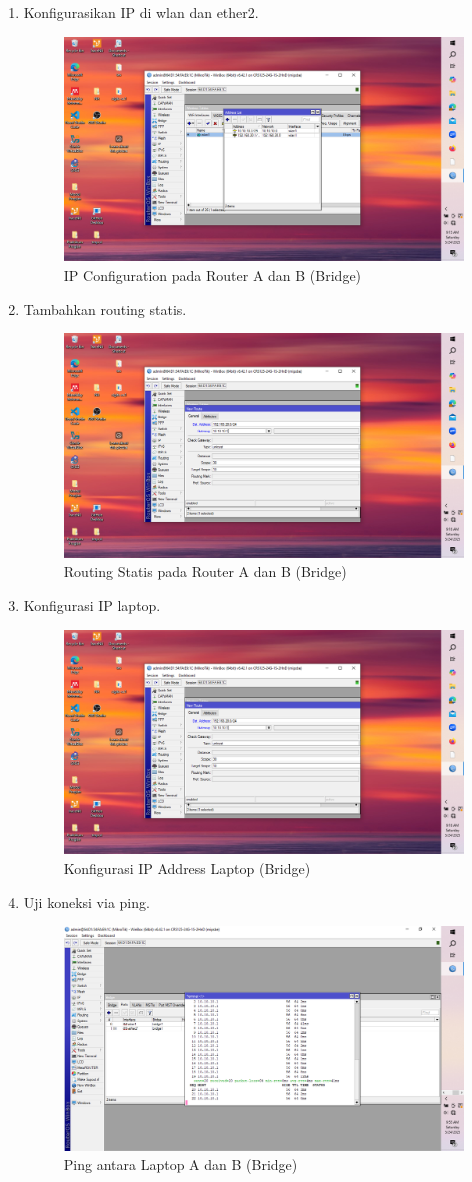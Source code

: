 \begin{enumerate}
    \item Konfigurasikan IP di wlan dan ether2.
    \begin{figure}[H]
        \centering
        \includegraphics[width=0.5\linewidth]{gambar4.png}
        \caption{IP Configuration pada Router A dan B (Bridge)}
        \label{fig:ip-bridge}
    \end{figure}

    \item Tambahkan routing statis.
    \begin{figure}[H]
        \centering
        \includegraphics[width=0.5\linewidth]{gambar5.png}
        \caption{Routing Statis pada Router A dan B (Bridge)}
        \label{fig:routing-bridge}
    \end{figure}

    \item Konfigurasi IP laptop.
    \begin{figure}[H]
        \centering
        \includegraphics[width=0.5\linewidth]{gambar5.png}
        \caption{Konfigurasi IP Address Laptop (Bridge)}
        \label{fig:ip-laptop-bridge}
    \end{figure}
    
    \item Uji koneksi via ping.
    \begin{figure}[H]
        \centering
        \includegraphics[width=0.5\linewidth]{ping3.png}
        \caption{Ping antara Laptop A dan B (Bridge)}
        \label{fig:ping-bridge}
    \end{figure}
\end{enumerate}



